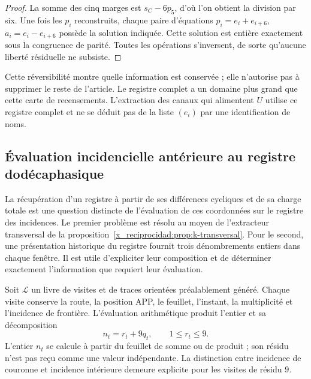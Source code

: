 \begin{proof}
La somme des cinq marges est \(s_C-6p_5\), d'où l'on obtient la
division par six. Une fois les \(p_i\) reconstruits, chaque paire d'équations
\(p_i=e_i+e_{i+6}\), \(a_i=e_i-e_{i+6}\) possède la solution indiquée.
Cette solution est entière exactement sous la congruence de parité. Toutes
les opérations s'inversent, de sorte qu'aucune liberté résiduelle ne subsiste.
\end{proof}

Cette réversibilité montre quelle information est conservée ; elle n’autorise pas à
supprimer le reste de l’article. Le registre complet a un domaine plus grand
que cette carte de recensements. L’extraction des canaux qui alimentent
\(U\) utilise ce registre complet et ne se déduit pas de la liste
\((e_i)\) par une identification de noms.


\subsection{Évaluation incidencielle antérieure au registre dodécaphasique}
\label{x_reciprocidad:subsec:registro-evaluacion-incidencial}

La récupération d’un registre à partir de ses différences cycliques et de sa
charge totale est une question distincte de l’évaluation de ces coordonnées
sur le registre des incidences. Le premier problème est résolu au moyen de
l’extracteur transversal de la proposition~\ref{x_reciprocidad:prop:k-transversal}.
Pour le second, une présentation historique du
registre fournit trois dénombrements entiers dans chaque fenêtre. Il est utile
d’expliciter leur composition et de déterminer exactement l’information que
requiert leur évaluation.

Soit \(\mathscr L\) un livre de visites et de traces orientées préalablement
généré. Chaque visite conserve la route, la position APP, le feuillet,
l'instant, la multiplicité et l'incidence de frontière. L'évaluation
arithmétique produit l'entier et sa décomposition
\[
 n_t=r_t+9q_t,\qquad 1\leq r_t\leq9.
\]
L'entier \(n_t\) se calcule à partir du feuillet de somme ou de produit ; son
résidu n'est pas reçu comme une valeur indépendante. La distinction entre
incidence de couronne et incidence intérieure demeure explicite pour les
visites de résidu \(9\).

